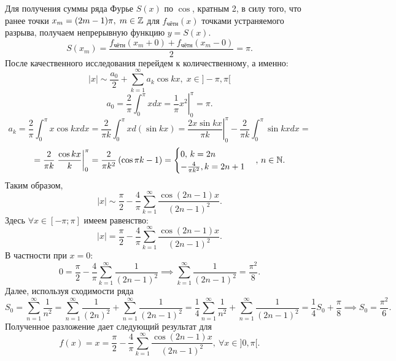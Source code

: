 \documentclass[../../main.tex]{subfiles}
\begin{document}
\begin{examples}
\begin{enumerate}
				Для получения суммы ряда Фурье $S(x)$ по $\cos$, кратным 2, в силу того, 
				что ранее точки $x_m = (2m -1)\pi, \; m \in \mathbb{Z}$ для $f_{\text{чётн}}(x)$ 
				точками устраняемого разрыва, получаем непрерывную функцию $y = S(x).$
				\[
					S(x_m) = \frac{f_{\text{чётн}}(x_m+0)+ f_{\text{чётн}}(x_m-0)}{2} = \pi.
				\]
				После качественного исследования перейдем к количественному, а именно:
				\[
					|x| \sim \frac{a_0}{2} + \sum_{k=1}^{\infty}  a_k \cos k x, \; x \in 
					]-\pi, \pi[
				\]
				\[
					a_0 = \frac{2}{\pi} \int_{0}^{\pi}xdx = \left. \frac{1}{\pi} x^2 
					\right|_0^{\pi} = \pi.
				\]
				\[
					a_k = \frac{2}{\pi} \int_{0}^{\pi}x \cos kx dx = 
					\frac{2}{\pi k } \int_{0}^{\pi}x d (\sin kx) = 
					\left. \frac{2x \sin kx}{\pi k}\right|_0^{\pi} - \frac{2}{\pi k} 
					\int_{0}^{\pi}\sin kx dx = 
				\]
				\[
				 = \frac{2}{\pi k} \left. \frac{\cos k x}{k} \right|_0^{\pi} =
				 \frac{2}{\pi k^2} \left( \cos \pi k - 1 \right) = 
				 \begin{cases}
				 0, \, k = 2n \\
				 -\frac{4}{\pi k^2}, k = 2n+1
				 \end{cases}, \, n \in \mathbb{N}.
				\]
				Таким образом,
				\[
					|x| \sim \frac{\pi}{2} - \frac{4}{\pi} 
					\sum_{k=1}^{\infty}\frac{\cos(2n-1)x}{(2n-1)^2}.
				\]
				Здесь $\forall x \in [-\pi; \pi]$ имеем равенство:
				\[
					|x| = \frac{\pi}{2} - \frac{4}{\pi} 
					\sum_{k=1}^{\infty}\frac{\cos(2n-1)x}{(2n-1)^2}.
				\]
				В частности при $x = 0:$
				\[
					0 = \frac{\pi}{2} - \frac{4}{\pi} \sum_{k=1}^{\infty}\frac{1}{(2n-1)^2} 
					\implies  \sum_{k=1}^{\infty}\frac{1}{(2n-1)^2} = \frac{\pi^2}{8}.
				\]
				Далее, используя сходимости ряда
				\[
					S_0 = \sum_{n=1}^{\infty} \frac{1}{n^2} = \sum_{n=1}^{\infty} 
					\frac{1}{(2n)^2}  + \sum_{n=1}^{\infty} \frac{1}{(2n-1)^2} = 
					\frac{1}{4} \sum_{n=1}^{\infty} \frac{1}{n^2} +  \sum_{n=1}^{\infty} 
					\frac{1}{(2n-1)^2} =
					\frac{1}{4}S_0 + \frac{\pi}{8} \implies S_0 = \frac{\pi^2}{6}.
				\]
				Полученное разложение дает следующий результат для 
				\[
					f(x) = x = \frac{\pi}{2} - \frac{4}{\pi} 
					\sum_{k=1}^{\infty}\frac{\cos(2n-1)x}{(2n-1)^2}, \ \forall x \in ]0, \pi[.
				\]
			\end{enumerate}
		\end{examples}
\end{document}
